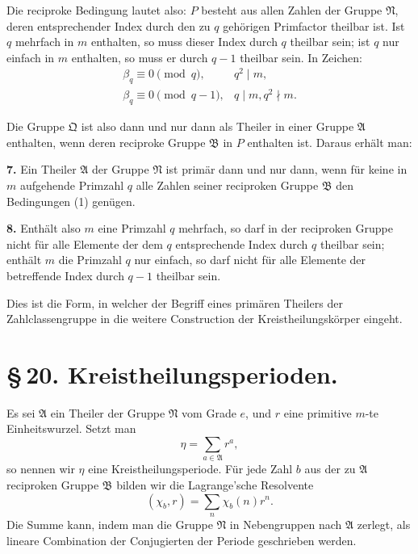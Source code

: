\documentclass[11pt]{article}
\providecommand{\grpA}{\mathfrak A}
\providecommand{\grpB}{\mathfrak B}
\providecommand{\grpN}{\mathfrak N}
\providecommand{\grpQ}{\mathfrak Q}
\begin{document}
Die reciproke Bedingung lautet also: $P$ besteht aus allen Zahlen der Gruppe $\grpN$, deren entsprechender Index durch den zu $q$ gehörigen Primfactor theilbar ist. Ist $q$ mehrfach in $m$ enthalten, so muss dieser Index durch $q$ theilbar sein; ist $q$ nur einfach in $m$ enthalten, so muss er durch $q-1$ theilbar sein. In Zeichen:
\begin{equation}
\begin{array}{ll}
 \beta_q\equiv0\pmod q,& q^2\mid m,\\
 \beta_q\equiv0\pmod {q-1},& q\mid m,
 q^2\nmid m.
\end{array}
\tag{1}
\end{equation}

Die Gruppe $\grpQ$ ist also dann und nur dann als Theiler in einer Gruppe $\grpA$ enthalten, wenn deren reciproke Gruppe $\grpB$ in $P$ enthalten ist. Daraus erhält man:

\medskip
\noindent\textbf{7.} Ein Theiler $\grpA$ der Gruppe $\grpN$ ist primär dann und nur dann, wenn für keine in $m$ aufgehende Primzahl $q$ alle Zahlen seiner reciproken Gruppe $\grpB$ den Bedingungen (1) genügen.

\medskip
\noindent\textbf{8.} Enthält also $m$ eine Primzahl $q$ mehrfach, so darf in der reciproken Gruppe nicht für alle Elemente der dem $q$ entsprechende Index durch $q$ theilbar sein; enthält $m$ die Primzahl $q$ nur einfach, so darf nicht für alle Elemente der betreffende Index durch $q-1$ theilbar sein.

Dies ist die Form, in welcher der Begriff eines primären Theilers der Zahlclassengruppe in die weitere Construction der Kreistheilungskörper eingeht.

\section*{\S\,20. Kreistheilungsperioden.}

Es sei $\grpA$ ein Theiler der Gruppe $\grpN$ vom Grade $e$, und $r$ eine primitive $m$-te Einheitswurzel. Setzt man
\begin{equation}
 \eta=\sum_{a\in\grpA} r^a,
\tag{1}
\end{equation}
so nennen wir $\eta$ eine Kreistheilungsperiode. Für jede Zahl $b$ aus der zu $\grpA$ reciproken Gruppe $\grpB$ bilden wir die Lagrange'sche Resolvente
\begin{equation}
 (\chi_b,r)=\sum_n \chi_b(n)r^n.
\tag{2}
\end{equation}
Die Summe kann, indem man die Gruppe $\grpN$ in Nebengruppen nach $\grpA$ zerlegt, als lineare Combination der Conjugierten der Periode geschrieben werden.
\end{document}
